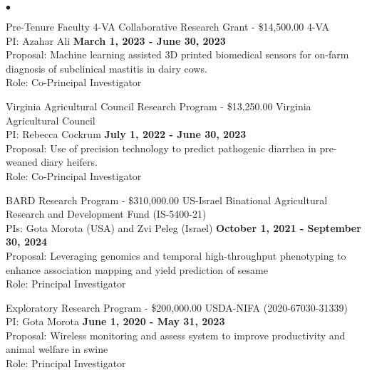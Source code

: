 \documentclass[margin,line,10pt]{res}
\newenvironment{list2}{
  \begin{list}{$\bullet$}{%
      \setlength{\itemsep}{0in}
      \setlength{\parsep}{0in} \setlength{\parskip}{0in}
      \setlength{\topsep}{0in} \setlength{\partopsep}{0in} 
      \setlength{\leftmargin}{0.2in}}}{\end{list}}
\begin{document}
\begin{resume}
\begin{list2}
  \item Pre-Tenure Faculty 4-VA Collaborative Research Grant - \$14,500.00  \hfill 4-VA \\
  PI: Azahar Ali  \hfill \textbf{March 1, 2023 -  June 30, 2023}\\
Proposal: Machine learning assisted 3D printed biomedical sensors for on-farm diagnosis of subclinical mastitis in dairy cows.  \\
Role: Co-Principal Investigator \\

\vspace{0.5cm}


  \item Virginia Agricultural Council Research Program - \$13,250.00  \hfill Virginia Agricultural Council \\
  PI: Rebecca Cockrum  \hfill \textbf{July 1, 2022 -  June 30, 2023}\\
Proposal: Use of precision technology to predict pathogenic diarrhea in pre-weaned diary heifers.  \\
Role: Co-Principal Investigator \\

\vspace{0.5cm}


\item BARD Research Program - \$310,000.00  \hfill US-Israel Binational Agricultural Research and Development Fund (IS-5400-21) \\
  PIs: Gota Morota (USA) and Zvi Peleg (Israel)   \hfill \textbf{October 1, 2021 -  September 30, 2024}\\
Proposal: Leveraging genomics and temporal high-throughput phenotyping to enhance association mapping and yield prediction of sesame  \\
Role: Principal Investigator \\


\vspace{0.5cm}


\item Exploratory Research Program - \$200,000.00  \hfill USDA-NIFA (2020-67030-31339)\\
  PI: Gota Morota   \hfill \textbf{June 1, 2020 -  May 31, 2023}\\
Proposal: Wireless monitoring and assess system to improve productivity and animal welfare in swine  \\
Role: Principal Investigator \\


\vspace{0.5cm}



\end{list2}
\end{resume}
\end{document}
